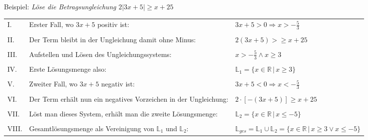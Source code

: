 Beispiel: \emph{L\"{o}se die Betragsungleichung $2 |3x + 5| \geq x + 25$}

\begin{table}[h!]
	\begin{tabular}{p{0.3cm} p{8.5cm} l}
		I. & Erster Fall, wo $3x + 5$ positiv ist: & $3x + 5 > 0 \Rightarrow x > -\frac{5}{3}$
		\\ && \\
		II. & Der Term bleibt in der Ungleichung damit ohne Minus: & $2 (3x + 5) > \geq x + 25$
		\\ && \\
		III. & Aufstellen und L\"{o}sen des Ungleichungssystems: & $x > -\frac{5}{3} \land x \geq 3$
		\\ && \\
		IV. & Erste L\"{o}sungsmenge also: & $\mathbb{L}_1 = \{ x \in \mathbb{R}\, |\, x \geq 3 \}$
		\\ && \\
		V. & Zweiter Fall, wo $3x + 5$ negativ ist: & $3x + 5 < 0 \Rightarrow x < -\frac{5}{3}$
		\\ && \\
		VI. & Der Term erh\"{a}lt nun ein negatives Vorzeichen in der Ungleichung: & $2 \cdot [-(3x + 5)] \geq x + 25$
		\\ && \\
		VII. & L\"{o}st man dieses System, erh\"{a}lt man die zweite L\"{o}sungsmenge: & $\mathbb{L}_2 = \{ x \in \mathbb{R} \, |\, x \leq -5\}$
		\\ && \\
		VIII. & Gesamtl\"{o}sungsmenge als Vereinigung von $\mathbb{L}_1$ und $\mathbb{L}_2$: & $\mathbb{L}_{ges} = \mathbb{L}_1 \cup \mathbb{L}_2 = \{ x \in \mathbb{R}\, |\, x \geq 3 \lor x \leq -5\}$
	\end{tabular}
\end{table}

